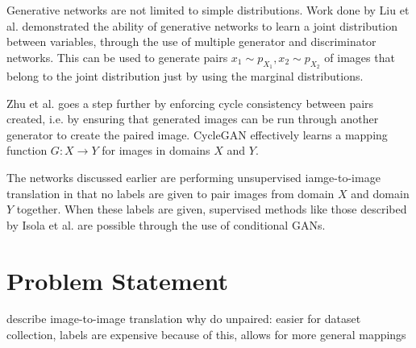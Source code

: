 \documentclass[10pt,twocolumn,letterpaper]{article}
\begin{document}
Generative networks are not limited to simple distributions.
Work done by Liu et al. \cite{cogan} demonstrated the ability of generative networks to learn a joint distribution between variables, through the use of multiple generator and discriminator networks.
This can be used to generate pairs $x_1 \sim p_{X_1}, x_2 \sim p_{X_2}$ of images that belong to the joint distribution just by using the marginal distributions.

Zhu et al. \cite{cycleGAN} goes a step further by enforcing cycle consistency between pairs created, i.e. by ensuring that generated images can be run through another generator to create the paired image.
CycleGAN effectively learns a mapping function $G : X \rightarrow Y$ for images in domains $X$ and $Y$.

The networks discussed earlier are performing unsupervised iamge-to-image translation in that no labels are given to pair images from domain $X$ and domain $Y$ together.
When these labels are given, supervised methods like those described by Isola et al. \cite{pix2pix} are possible through the use of conditional GANs.

\section{Problem Statement}
describe image-to-image translation
why do unpaired: easier for dataset collection, labels are expensive
                 because of this, allows for more general mappings
\end{document}
